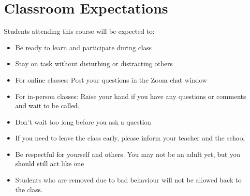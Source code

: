 \documentclass{../../oss-handout}
\begin{document}
\section*{Classroom Expectations}
Students attending this course will be expected to:
\begin{itemize}[nosep,leftmargin=15pt]
\item Be ready to learn and participate during class
\item Stay on task without disturbing or distracting others
\item For online classes: Post your questions in the Zoom chat window
\item For in-person classes: Raise your hand if you have any questions or
  comments and wait to be called.
\item Don't wait too long before you ask a question
\item If you need to leave the class early, please inform your teacher and the
  school %
\item Be respectful for yourself and others. You may not be an adult yet, but
  you should still act like one%
\item Students who are removed due to bad behaviour will not be allowed back to
  the class.
\end{itemize}
\end{document}
